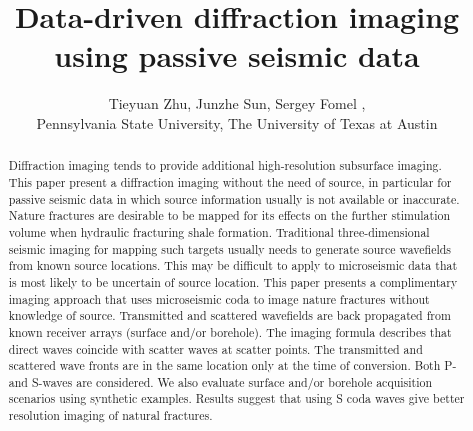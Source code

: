 
\title{Data-driven diffraction imaging using passive seismic data}
\renewcommand{\thefootnote}{\fnsymbol{footnote}}

\author{Tieyuan Zhu\footnotemark[1]\footnotemark[2], Junzhe Sun\footnotemark[2], Sergey Fomel \footnotemark[2],\\ \footnotemark[1]Pennsylvania State University, \footnotemark[2]The University of Texas at Austin}


\maketitle

\begin{abstract}
Diffraction imaging tends to provide additional high-resolution subsurface imaging. This paper present a diffraction imaging without the need of source, in particular for passive seismic data in which source information usually is not available or inaccurate.
Nature fractures are desirable to be mapped for its effects on the further stimulation volume when hydraulic fracturing shale formation. Traditional three-dimensional seismic imaging for mapping such targets usually needs to generate source wavefields from known source locations. This may be difficult to apply to microseismic data that is most likely to be uncertain of source location. This paper presents a complimentary imaging approach that uses microseismic coda to image nature fractures without knowledge of source. Transmitted and scattered wavefields are back propagated from known receiver arrays (surface and/or borehole). The imaging formula describes that direct waves coincide with scatter waves at scatter points. The transmitted and scattered wave fronts are in the same location only at the time of conversion. Both P- and S-waves are considered. We also evaluate surface and/or borehole acquisition scenarios using synthetic examples. Results suggest that using S coda waves give better resolution imaging of natural fractures.
\end{abstract}

